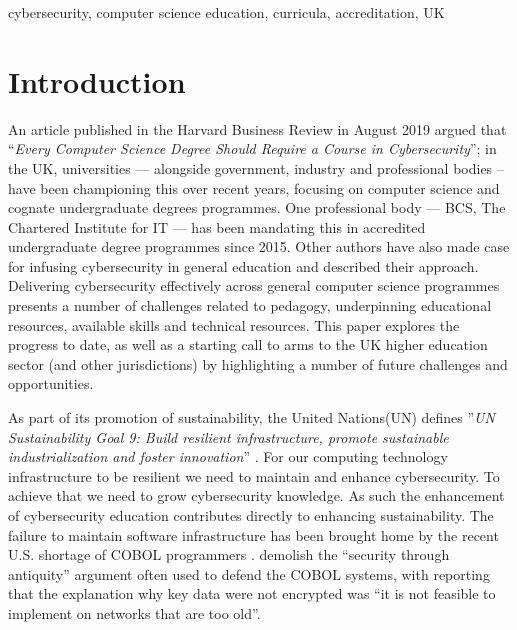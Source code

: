 \documentclass[conference]{IEEEtran}
\begin{document}
\begin{IEEEkeywords}
cybersecurity, computer science education, curricula, accreditation, UK
\end{IEEEkeywords}

\section{Introduction}\label{sec:intro}
An article published in the Harvard Business Review in August 2019 argued that ``{\emph{Every Computer Science Degree Should Require a Course in Cybersecurity}}''\cite{cable_2019}; in the UK, universities
--- alongside government, industry and professional bodies -- have been championing this over recent years, focusing on computer science and cognate undergraduate degrees programmes. One professional body --- BCS, The Chartered Institute for IT --- has been mandating this in accredited undergraduate degree programmes since 2015\cite{Cricketal2019}. Other authors have also made case for infusing cybersecurity in general education \cite{Sobiesk2015} and described their approach\cite{Blair2020}.  Delivering cybersecurity effectively across general computer science programmes presents a number of challenges related to pedagogy, underpinning educational resources, available skills and technical resources. This paper explores the progress to date, as well as a starting call to arms to the UK higher education sector (and other jurisdictions) by highlighting a number of future challenges and opportunities.

As part of its promotion of sustainability, the United Nations(UN) defines ''{\em{UN Sustainability Goal 9: Build resilient infrastructure, promote sustainable industrialization and foster innovation}}'' \cite{UNgoal9}. For our computing technology infrastructure to be resilient we need to maintain and enhance cybersecurity. To achieve that we need to grow cybersecurity knowledge. As such the enhancement of cybersecurity education contributes directly to enhancing sustainability. The failure to maintain software infrastructure has been brought home by the recent U.S. shortage of COBOL programmers \cite{Shein2020e}.  \cite{PangTanriverdi2017a} demolish the ``security through antiquity'' argument often used to defend the COBOL systems, with \cite{Sternstein2015a} reporting that the explanation why key data were not encrypted was ``it is not feasible to implement on networks that are too old''.

\end{document}
